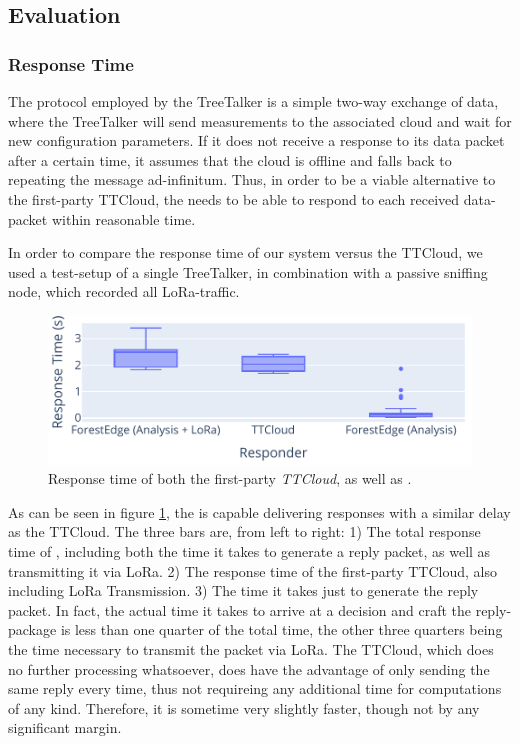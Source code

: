 \subsection{Evaluation}
\label{sec:TreeTalker:evaluation}

\subsubsection{Response Time}
\label{sec:evaluation:response-time}

The protocol employed by the TreeTalker is a simple two-way exchange of data, where the TreeTalker will send measurements to the associated cloud and wait for new configuration parameters.
If it does not receive a response to its data packet after a certain time, it assumes that the cloud is offline and falls back to repeating the message ad-infinitum.
Thus, in order to be a viable alternative to the first-party TTCloud, the \ttt needs to be able to respond to each received data-packet within reasonable time.

In order to compare the response time of our system versus the TTCloud, we used a test-setup of a single TreeTalker, in combination with a passive sniffing node, which recorded all LoRa-traffic.

\begin{figure}
    \centering
    \includegraphics[width=\linewidth]{figures/response_times.pdf}
    \caption{Response time of both the first-party \textit{TTCloud}, as well as \textit{\ttt}.}
    \label{fig:response_times}
\end{figure}

As can be seen in figure \ref{fig:response_times}, the \ttt is capable delivering responses with a similar delay as the TTCloud.
The three bars are, from left to right: 1) The total response time of \ttt, including both the time it takes to generate a reply packet, as well as transmitting it via LoRa. 2) The response time of the first-party TTCloud, also including LoRa Transmission. 3) The time it takes \ttt just to generate the reply packet.
In fact, the actual time it takes to arrive at a decision and craft the reply-package is less than one quarter of the total time, the other three quarters being the time necessary to transmit the packet via LoRa.
The TTCloud, which does no further processing whatsoever, does have the advantage of only sending the same reply every time, thus not requireing any additional time for computations of any kind.
Therefore, it is sometime very slightly faster, though not by any significant margin.

